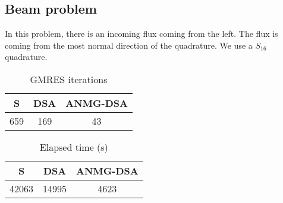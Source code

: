 \subsection{Beam problem}
In this problem, there is an incoming flux coming from the left. The flux is
coming from the most normal direction of the quadrature. We use a $S_{16}$
quadrature.

\begin{table}[H]
\begin{center}
\begin{tabular}{|c|c|c|}
\hline  
S & DSA & ANMG-DSA \\
\hline
659 & 169 & 43 \\
\hline
\end{tabular}
\caption{GMRES iterations}
\end{center}
\end{table}

\begin{table}[H]
\begin{center}
\begin{tabular}{|c|c|c|}
\hline  
S & DSA & ANMG-DSA \\
\hline
42063 & 14995 & 4623\\
\hline
\end{tabular}
\caption{Elapsed time (s)}
\end{center}
\end{table}
